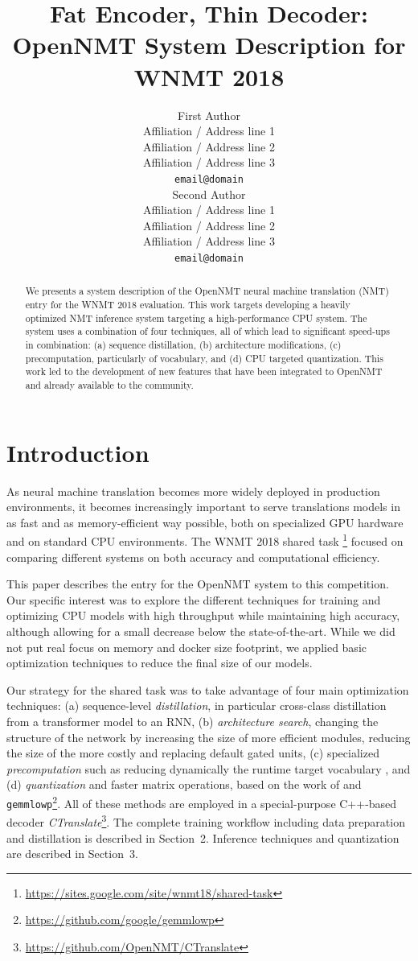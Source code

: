 \documentclass[11pt,a4paper]{article}
\title{Fat Encoder, Thin Decoder: \protect\\ OpenNMT System Description for WNMT 2018}
\author{First Author \\
  Affiliation / Address line 1 \\
  Affiliation / Address line 2 \\
  Affiliation / Address line 3 \\
  {\tt email@domain} \\\And
  Second Author \\
  Affiliation / Address line 1 \\
  Affiliation / Address line 2 \\
  Affiliation / Address line 3 \\
  {\tt email@domain} \\}
\date{}
\begin{document}
\maketitle
\begin{abstract}

  We presents a system description of the OpenNMT neural machine
  translation (NMT) entry for the WNMT 2018 evaluation. This work
  targets developing a heavily optimized NMT inference system
  targeting a high-performance CPU system. The system uses a
  combination of four techniques, all of which lead to significant
  speed-ups in combination: (a) sequence distillation, (b)
  architecture modifications, (c) precomputation, particularly of
  vocabulary, and (d) CPU targeted quantization. This work led to the
  development of new features that have been integrated to OpenNMT and
  already available to the community.

\end{abstract}

\section{Introduction}

As neural machine translation becomes more widely deployed in
production environments, it becomes increasingly important to serve
translations models in as fast and as memory-efficient way possible,
both on specialized GPU hardware and on standard CPU environments. The
WNMT 2018 shared task
\footnote{\url{https://sites.google.com/site/wnmt18/shared-task}}
focused on comparing different systems on both accuracy and
computational efficiency.


This paper describes the entry for the OpenNMT system to this
competition.  Our specific interest was to explore the different
techniques for training and optimizing CPU models with high throughput
while maintaining high accuracy, although allowing for a small
decrease below the state-of-the-art. While we did not put real focus
on memory and docker size footprint, we applied basic optimization
techniques to reduce the final size of our models.

Our strategy for the shared task was to take advantage of four main
optimization techniques: (a) sequence-level \textit{distillation}, in
particular cross-class distillation from a transformer model
\cite{vaswani2017attention} to an RNN, (b) \textit{architecture
  search}, changing the structure of the network by increasing the
size of more efficient modules, reducing the size of the more costly
and replacing default gated units,  (c)
specialized \textit{precomputation} such as reducing dynamically the
runtime target vocabulary \cite{shi2017speeding}, and (d) \textit{quantization} and
faster matrix operations, based on the work of
 and {\tt
  gemmlowp}\footnote{\url{https://github.com/google/gemmlowp}}. All of these
methods are employed in a special-purpose C++-based decoder
\textit{CTranslate}\footnote{\url{https://github.com/OpenNMT/CTranslate}}.
The complete training workflow including data preparation and
distillation is described in Section~2. Inference techniques and quantization are
described in Section~3.
\end{document}
